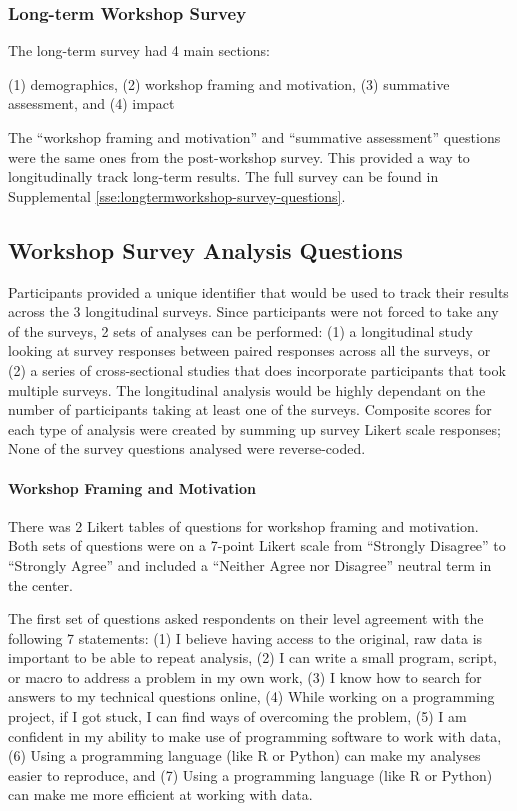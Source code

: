 \documentclass[030-workshop.tex]{subfiles}
\begin{document}
  \subsubsection{Long-term Workshop Survey}

    The long-term survey had 4 main sections:

    (1) demographics,
    (2) workshop framing and motivation,
    (3) summative assessment, and
    (4) impact

    The ``workshop framing and motivation'' and ``summative assessment'' questions were
    the same ones from the post-workshop survey.
    This provided a way to longitudinally track long-term results.
    The full survey can be found in Supplemental \ref{sse:longtermworkshop-survey-questions}.

  \subsection{Workshop Survey Analysis Questions}

    Participants provided a unique identifier that would be used to track their results across the 3 longitudinal surveys.
    Since participants were not forced to take any of the surveys,
    2 sets of analyses can be performed:
    (1) a longitudinal study looking at survey responses between paired responses across all the surveys, or
    (2) a series of cross-sectional studies that does incorporate participants that took multiple surveys.
    The longitudinal analysis would be highly dependant on the number of participants taking at least one of the surveys.
    Composite scores for each type of analysis were created by summing up survey Likert scale responses;
    None of the survey questions analysed were reverse-coded.

      \paragraph{Workshop Framing and Motivation}

          There was 2 Likert tables of questions for workshop framing and motivation.
          Both sets of questions were on a 7-point Likert scale from
          ``Strongly Disagree'' to ``Strongly Agree'' and
          included a ``Neither Agree nor Disagree'' neutral term in the center.

          The first set of questions asked respondents on their level agreement with the following 7 statements:
          (1) I believe having access to the original, raw data is important to be able to repeat analysis,
          (2) I can write a small program, script, or macro to address a problem in my own work,
          (3) I know how to search for answers to my technical questions online,
          (4) While working on a programming project, if I got stuck, I can find ways of overcoming the problem,
          (5) I am confident in my ability to make use of programming software to work with data,
          (6) Using a programming language (like R or Python) can make my analyses easier to reproduce, and
          (7) Using a programming language (like R or Python) can make me more efficient at working with data.
\end{document}
